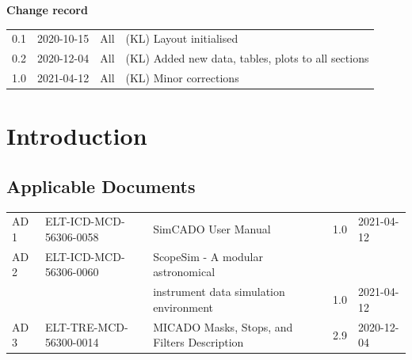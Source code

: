 \documentclass[a4paper,twoside,11pt]{report}
\begin{document}

\dmdmaketitle


\begin{center}
  \textbf{Change record}

  \tabletail{\hline}

  \begin{supertabular}{|l|l|l|l|}
   0.1 & 2020-10-15 & All & (KL) Layout initialised \\
   0.2 & 2020-12-04 & All & (KL) Added new data, tables, plots to all sections \\
   1.0 & 2021-04-12 & All & (KL) Minor corrections \\
   \hline
  \end{supertabular}

\end{center}


\setcounter{tocdepth}{3}
\tableofcontents
\cleardoublepage


\chapter{Introduction}

\section{Applicable Documents}

\begin{center}
  \tabletail{\hline}

  \begin{supertabular}{|l|l|l|c|l|}
    AD\,1 & ELT-ICD-MCD-56306-0058 & SimCADO User Manual & 1.0 & 2021-04-12 \\
    AD\,2 & ELT-ICD-MCD-56306-0060 & ScopeSim - A modular astronomical & & \\
    & & instrument data simulation environment & 1.0 & 2021-04-12 \\
    AD\,3 & ELT-TRE-MCD-56300-0014 & MICADO Masks, Stops, and Filters Description & 2.9 & 2020-12-04 \\
  \end{supertabular}
\end{center}
\end{document}
